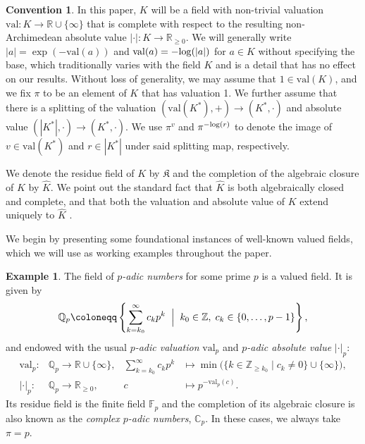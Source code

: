 \documentclass[10pt]{article}
\theoremstyle{definition}
\newtheorem{example}[theorem]{Example}
\newtheorem{convention}[theorem]{Convention}
\def\log{{\rm log}}
\newcommand{\CC}{\mathbb{C}}
\newcommand{\RR}{\mathbb{R}}
\newcommand{\FF}{\mathbb{F}}
\newcommand{\ZZ}{\mathbb{Z}}
\newcommand{\QQ}{\mathbb{Q}}
\newcommand{\suchthat}{\;\ifnum\currentgrouptype=16 \middle\fi|\;}
\newcommand{\bigmid}{\left.\vphantom{\Big\{} \suchthat \vphantom{\Big\}}\right.}
\newcommand{\val}{{\mathrm{val}}}
\begin{document}
\begin{convention}
  \label{con:valuedField}
  In this paper, $K$ will be a field with non-trivial valuation $\val\colon K\rightarrow\RR\cup\{\infty\}$ that is complete with respect to the resulting non-Archimedean absolute value $|\cdot|\colon K\rightarrow \RR_{\geq 0}$. We will generally write $|a|=\exp(-\val(a))$ and $\val(a)=-\log(|a|)$ for $a\in K$ without specifying the base, which traditionally varies with the field $K$ and is a detail that has no effect on our results. Without loss of generality, we may assume that $1\in\val(K)$, and we fix $\pi$ to be an element of $K$ that has valuation 1. We further assume that there is a splitting of the valuation $(\val(K^\ast),+)\rightarrow (K^\ast,\cdot)$ and absolute value $(|K^\ast|,\cdot)\rightarrow (K^\ast,\cdot)$. We use $\pi^v$ and $\pi^{-\log(r)}$ to denote the image of $v\in\val(K^\ast)$ and $r\in|K^\ast|$ under said splitting map, respectively.

  We denote the residue field of $K$ by $\mathfrak K$ and the completion of the algebraic closure of $K$ by $\hat{K}$. We point out the standard fact that $\hat{K}$ is both algebraically closed and complete, and that both the valuation and absolute value of $K$ extend uniquely to $\hat K$ \cite[Section 3.2.4 Theorem 2]{BGR84}.

\end{convention}

We begin by presenting some foundational instances of well-known valued fields, which we will use as working examples throughout the paper.

\begin{example}
  \label{ex:padicNumbers}
  The field of \emph{$p$-adic numbers} for some prime $p$ is a valued field.  It is given by
  \begin{equation*}
    \QQ_p\coloneqq\left\{\sum_{k=k_0}^\infty c_k p^k \bigmid k_0\in\ZZ,\; c_k\in \{0,\dots,p-1\} \right\},
  \end{equation*}
  and endowed with the usual \emph{$p$-adic valuation} $\val_p$ and \emph{$p$-adic absolute value} $|\cdot|_p$:
  \begin{align*}
    \val_p\colon &\QQ_p\rightarrow \RR\cup\{\infty\}, & \sum_{k=k_0}^\infty c_k p^k&\mapsto \min\Big(\{k\in\ZZ_{\geq k_0}\mid c_k\neq 0\}\cup\{\infty\}\Big),\\
    |\cdot|_p\colon&\QQ_p \rightarrow \RR_{\geq 0}, & c&\mapsto p^{-\val_p(c)}.
  \end{align*}
  Its residue field is the finite field $\FF_p$ and the completion of its algebraic closure is also known as the \emph{complex $p$-adic numbers}, $\CC_p$. In these cases, we always take $\pi = p$.
\end{example}
\end{document}
